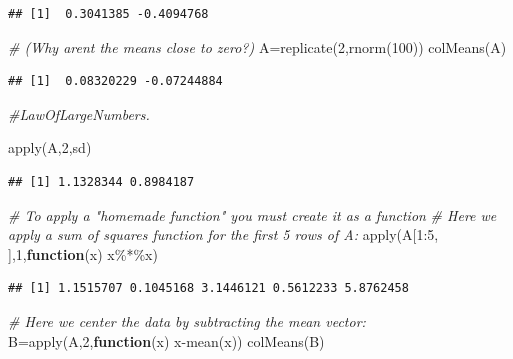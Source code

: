 \documentclass[
]{article}
\newenvironment{Shaded}{\begin{snugshade}}{\end{snugshade}}
\newcommand{\CommentTok}[1]{\textcolor[rgb]{0.56,0.35,0.01}{\textit{#1}}}
\newcommand{\ControlFlowTok}[1]{\textcolor[rgb]{0.13,0.29,0.53}{\textbf{#1}}}
\newcommand{\DecValTok}[1]{\textcolor[rgb]{0.00,0.00,0.81}{#1}}
\newcommand{\FunctionTok}[1]{\textcolor[rgb]{0.00,0.00,0.00}{#1}}
\newcommand{\NormalTok}[1]{#1}
\newcommand{\OtherTok}[1]{\textcolor[rgb]{0.56,0.35,0.01}{#1}}
\newcommand{\SpecialCharTok}[1]{\textcolor[rgb]{0.00,0.00,0.00}{#1}}
\theoremstyle{definition}
\theoremstyle{definition}
\theoremstyle{definition}
\theoremstyle{definition}
\theoremstyle{remark}
\begin{document}
\begin{verbatim}
## [1]  0.3041385 -0.4094768
\end{verbatim}

\begin{Shaded}
\begin{Highlighting}[]
\CommentTok{\# (Why aren\textquotesingle{}t the means close to zero?)}
\NormalTok{A}\OtherTok{=}\FunctionTok{replicate}\NormalTok{(}\DecValTok{2}\NormalTok{,}\FunctionTok{rnorm}\NormalTok{(}\DecValTok{100}\NormalTok{))}
\FunctionTok{colMeans}\NormalTok{(A)}
\end{Highlighting}
\end{Shaded}

\begin{verbatim}
## [1]  0.08320229 -0.07244884
\end{verbatim}

\begin{Shaded}
\begin{Highlighting}[]
\CommentTok{\#LawOfLargeNumbers.}

\FunctionTok{apply}\NormalTok{(A,}\DecValTok{2}\NormalTok{,sd)}
\end{Highlighting}
\end{Shaded}

\begin{verbatim}
## [1] 1.1328344 0.8984187
\end{verbatim}

\begin{Shaded}
\begin{Highlighting}[]
\CommentTok{\# To apply a "homemade function" you must create it as a function}
\CommentTok{\# Here we apply a sum of squares function for the first 5 rows of A:}
\FunctionTok{apply}\NormalTok{(A[}\DecValTok{1}\SpecialCharTok{:}\DecValTok{5}\NormalTok{, ],}\DecValTok{1}\NormalTok{,}\ControlFlowTok{function}\NormalTok{(x) x}\SpecialCharTok{\%*\%}\NormalTok{x)}
\end{Highlighting}
\end{Shaded}

\begin{verbatim}
## [1] 1.1515707 0.1045168 3.1446121 0.5612233 5.8762458
\end{verbatim}

\begin{Shaded}
\begin{Highlighting}[]
\CommentTok{\# Here we center the data by subtracting the mean vector:}
\NormalTok{B}\OtherTok{=}\FunctionTok{apply}\NormalTok{(A,}\DecValTok{2}\NormalTok{,}\ControlFlowTok{function}\NormalTok{(x) x}\SpecialCharTok{{-}}\FunctionTok{mean}\NormalTok{(x))}
\FunctionTok{colMeans}\NormalTok{(B)}
\end{Highlighting}
\end{Shaded}
\end{document}
